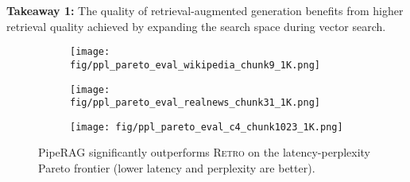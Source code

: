 \begin{tcolorbox}[
    enhanced,
    arc=2mm, %
    outer arc=2mm, %
    boxrule=0.8pt, %
    colframe=black, %
    colback=white, %
    boxsep=0pt, %
    drop shadow southeast, %
]

\textbf{Takeaway 1:} The quality of retrieval-augmented generation benefits from higher retrieval quality achieved by expanding the search space during vector search.
\end{tcolorbox}

\begin{figure*}[t]

\begin{subfigure}
    \centering
    \texttt{[image: fig/ppl\_pareto\_eval\_wikipedia\_chunk9\_1K.png]}
\end{subfigure}
\hfill
\begin{subfigure}
    \centering
    \texttt{[image: fig/ppl\_pareto\_eval\_realnews\_chunk31\_1K.png]}
\end{subfigure}
\hfill
\begin{subfigure}
    \centering
    \texttt{[image: fig/ppl\_pareto\_eval\_c4\_chunk1023\_1K.png]}
\end{subfigure}

  \vspace{-1em}
  \caption{PipeRAG significantly outperforms \textsc{Retro} on the latency-perplexity Pareto frontier (lower latency and perplexity are better).}
  \vspace{-0.5em}
  \label{fig:eval_e2e}
\end{figure*}

